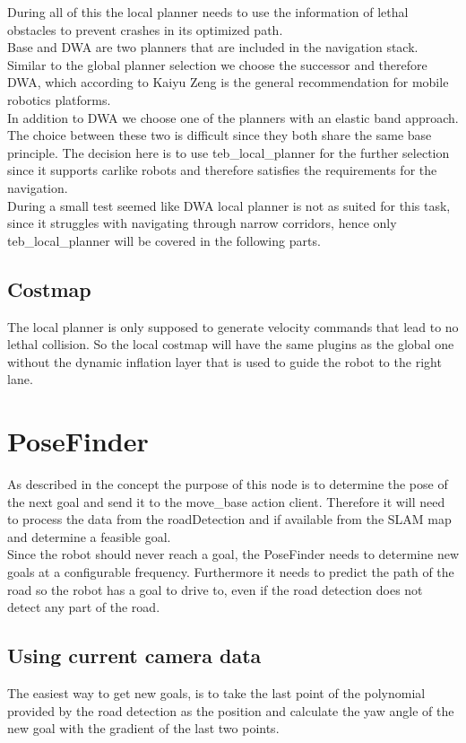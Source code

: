 During all of this the local planner needs to use the information of lethal obstacles to prevent crashes in its optimized path.\\


Base and DWA are two planners that are included in the navigation stack. Similar to the global planner selection we choose the successor and therefore DWA, which according to Kaiyu Zeng is the general recommendation for mobile robotics platforms\cite{navtuningguide}.\\


In addition to DWA we choose one of the planners with an elastic band approach. The choice between these two is difficult since they both share the same base principle. The decision here is to use teb\_local\_planner for the further selection since it supports carlike robots and therefore satisfies the requirements for the navigation.\\

During a small test seemed like DWA local planner is not as suited for this task, since it struggles with navigating through narrow corridors, hence only teb\_local\_planner will be covered in the following parts.

\subsection{Costmap}
The local planner is only supposed to generate velocity commands that lead to no lethal collision. So the local costmap will have the same plugins as the global one without the dynamic inflation layer that is used to guide the robot to the right lane.


\section{PoseFinder}
As described in the concept the purpose of this node is to determine the pose of the next goal and send it to the move\_base action client. Therefore it will need to process the data from the roadDetection and if available from the SLAM map and determine a feasible goal.\\
Since the robot should never reach a goal, the PoseFinder needs to determine new goals at a configurable frequency. Furthermore it needs to predict the path of the road so the robot has a goal to drive to, even if the road detection does not detect any part of the road.



\subsection{Using current camera data}
The easiest way to get new goals, is to take the last point of the polynomial provided by the road detection as the position and calculate the yaw angle of the new goal with the gradient of the last two points.\\

